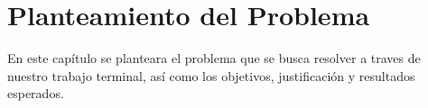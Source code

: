 \chapter{Planteamiento del Problema}
En este capítulo se planteara el problema que se busca resolver a traves de nuestro trabajo terminal, así como los objetivos, justificación y resultados esperados.